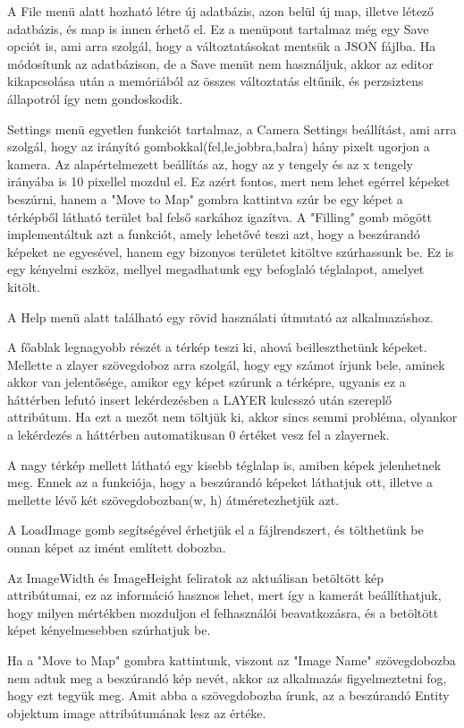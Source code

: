 A File menü alatt hozható létre új adatbázis, azon belül új map, illetve létező adatbázis, és map is innen érhető el. Ez a menüpont tartalmaz még egy Save opciót is, ami arra szolgál, hogy a változtatásokat mentsük a JSON fájlba. Ha módosítunk az adatbázison, de a Save menüt nem használjuk, akkor az editor kikapcsolása után a memóriából az összes változtatás eltűnik, és perzsiztens állapotról így nem gondoskodik.

Settings menü egyetlen funkciót tartalmaz, a Camera Settings beállítást, ami arra szolgál, hogy az irányító gombokkal(fel,le,jobbra,balra) hány pixelt ugorjon a kamera. Az alapértelmezett beállítás az, hogy az y tengely és az x tengely irányába is 10 pixellel mozdul el.
Ez azért fontos, mert nem lehet egérrel képeket beszúrni, hanem a "Move to Map" gombra kattintva szúr be egy képet a térképből látható terület bal felső sarkához igazítva. 
A "Filling" gomb mögött implementáltuk azt a funkciót, amely lehetővé teszi azt, hogy a beszúrandó képeket ne egyesével, hanem egy bizonyos területet kitöltve szúrhassunk be. Ez is egy kényelmi eszköz, mellyel megadhatunk egy befoglaló téglalapot, amelyet kitölt.

A Help menü alatt található egy rövid használati útmutató az alkalmazáshoz.

A főablak legnagyobb részét a térkép teszi ki, ahová beilleszthetünk képeket. Mellette a zlayer szövegdoboz arra szolgál, hogy egy számot írjunk bele, aminek akkor van jelentősége, amikor egy képet szúrunk a térképre, ugyanis ez a háttérben lefutó insert lekérdezésben a LAYER kulcsszó után szereplő attribútum. Ha ezt a mezőt nem töltjük ki, akkor sincs semmi probléma, olyankor a lekérdezés a háttérben automatikusan 0 értéket vesz fel a zlayernek.

A nagy térkép mellett látható egy kisebb téglalap is, amiben képek jelenhetnek meg. Ennek az a funkciója, hogy a beszúrandó képeket láthatjuk ott, illetve a mellette lévő két szövegdobozban(w, h) átméretezhetjük azt. 

A LoadImage gomb segítségével érhetjük el a fájlrendszert, és tölthetünk be onnan képet az imént említett dobozba.

Az ImageWidth és ImageHeight feliratok az aktuálisan betöltött kép attribútumai, ez az információ hasznos lehet, mert így a kamerát beállíthatjuk, hogy milyen mértékben mozduljon el felhasználói beavatkozásra, és a betöltött képet kényelmesebben szúrhatjuk be.

Ha a "Move to Map" gombra kattintunk, viszont az "Image Name" szövegdobozba nem adtuk meg a beszúrandó kép nevét, akkor az alkalmazás figyelmeztetni fog, hogy ezt tegyük meg. Amit abba a szövegdobozba írunk, az a beszúrandó Entity objektum image attribútumának lesz az értéke. 

